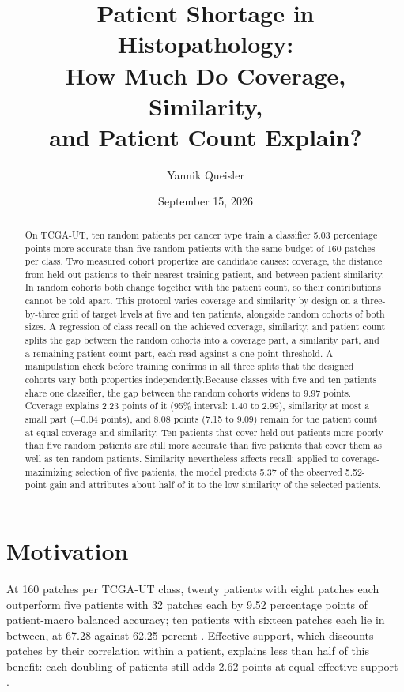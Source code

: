 \documentclass[11pt]{article}
\title{Patient Shortage in Histopathology:\\How Much Do Coverage, Similarity,\\and Patient Count Explain?}
\author{Yannik Queisler}
\date{September 15, 2026}
\begin{document}
\raggedbottom
{}
\setlength{\emergencystretch}{2em}
\maketitle
\begin{abstract}
\noindent On TCGA-UT, ten random patients per cancer type train a classifier 5.03 percentage points more accurate than five random patients with the same budget of 160 patches per class. Two measured cohort properties are candidate causes: coverage, the distance from held-out patients to their nearest training patient, and between-patient similarity. In random cohorts both change together with the patient count, so their contributions cannot be told apart. This protocol varies coverage and similarity by design on a three-by-three grid of target levels at five and ten patients, alongside random cohorts of both sizes. A regression of class recall on the achieved coverage, similarity, and patient count splits the gap between the random cohorts into a coverage part, a similarity part, and a remaining patient-count part, each read against a one-point threshold. A manipulation check before training confirms in all three splits that the designed cohorts vary both properties independently.Because classes with five and ten patients share one classifier, the gap between the random cohorts widens to 9.97 points. Coverage explains 2.23 points of it (95\% interval: 1.40 to 2.99), similarity at most a small part ($-0.04$ points), and 8.08 points (7.15 to 9.09) remain for the patient count at equal coverage and similarity. Ten patients that cover held-out patients more poorly than five random patients are still more accurate than five patients that cover them as well as ten random patients. Similarity nevertheless affects recall: applied to coverage-maximizing selection of five patients, the model predicts 5.37 of the observed 5.52-point gain and attributes about half of it to the low similarity of the selected patients.
\end{abstract}
\setcounter{tocdepth}{1}
\tableofcontents
\clearpage

\section{Motivation}
\label{sec:motivation}
At 160 patches per TCGA-UT class, twenty patients with eight patches each outperform five patients with 32 patches each by 9.52 percentage points of patient-macro balanced accuracy; ten patients with sixteen patches each lie in between, at 67.28 against 62.25 percent \citep{queisler2026effectiveSupport}. Effective support, which discounts patches by their correlation within a patient, explains less than half of this benefit: each doubling of patients still adds 2.62 points at equal effective support \citep{queisler2026multidirectionalRedundancy}.
\end{document}

